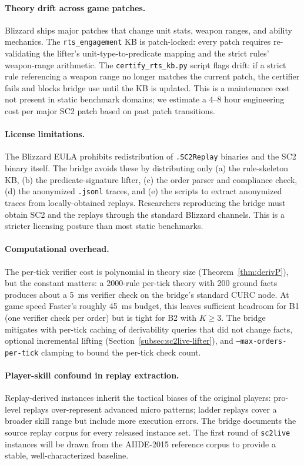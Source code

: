 \documentclass{article}
\theoremstyle{definition}
\begin{document}
\paragraph{Theory drift across game patches.} Blizzard ships major patches that change unit stats, weapon ranges, and ability mechanics. The \texttt{rts\_engagement} KB is patch-locked: every patch requires re-validating the lifter's unit-type-to-predicate mapping and the strict rules' weapon-range arithmetic. The \texttt{certify\_rts\_kb.py} script flags drift: if a strict rule referencing a weapon range no longer matches the current patch, the certifier fails and blocks bridge use until the KB is updated. This is a maintenance cost not present in static benchmark domains; we estimate a 4--8 hour engineering cost per major SC2 patch based on past patch transitions.

\paragraph{License limitations.} The Blizzard EULA prohibits redistribution of \texttt{.SC2Replay} binaries and the SC2 binary itself. The bridge avoids these by distributing only (a) the rule-skeleton KB, (b) the predicate-signature lifter, (c) the order parser and compliance check, (d) the anonymized \texttt{.jsonl} traces, and (e) the scripts to extract anonymized traces from locally-obtained replays. Researchers reproducing the bridge must obtain SC2 and the replays through the standard Blizzard channels. This is a stricter licensing posture than most static benchmarks.

\paragraph{Computational overhead.} The per-tick verifier cost is polynomial in theory size (Theorem~\ref{thm:derivP}), but the constant matters: a 2000-rule per-tick theory with 200 ground facts produces about a 5~ms verifier check on the bridge's standard CURC node. At game speed Faster's roughly 45~ms budget, this leaves sufficient headroom for B1 (one verifier check per order) but is tight for B2 with $K \geq 3$. The bridge mitigates with per-tick caching of derivability queries that did not change facts, optional incremental lifting (Section~\ref{subsec:sc2live-lifter}), and \texttt{--max-orders-per-tick} clamping to bound the per-tick check count.

\paragraph{Player-skill confound in replay extraction.} Replay-derived instances inherit the tactical biases of the original players: pro-level replays over-represent advanced micro patterns; ladder replays cover a broader skill range but include more execution errors. The bridge documents the source replay corpus for every released instance set. The first round of \texttt{sc2live} instances will be drawn from the AIIDE-2015 reference corpus to provide a stable, well-characterized baseline.
\end{document}
